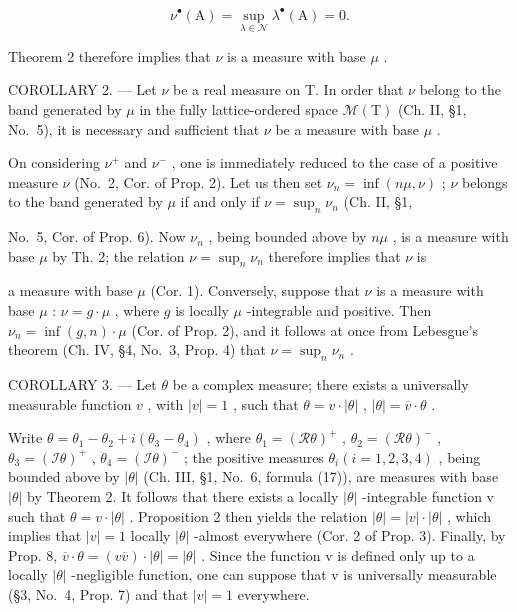 \[
\nu^ {\bullet} (\mathrm{A}) = \sup _ {\lambda \in \mathcal {N}} \lambda^ {\bullet} (\mathrm{A}) = 0.
\]

Theorem 2 therefore implies that \(\nu\) is a measure with base \(\mu\) .

COROLLARY 2. --- Let \(\nu\) be a real measure on T. In order that \(\nu\) belong to the band generated by \(\mu\) in the fully lattice-ordered space \(\mathcal{M}(\mathrm{T})\) (Ch. II, §1, No.~5), it is necessary and sufficient that \(\nu\) be a measure with base \(\mu\) .

On considering \(\nu^{+}\) and \(\nu^{-}\) , one is immediately reduced to the case of a positive measure \(\nu\) (No.~2, Cor. of Prop. 2). Let us then set \(\nu_{n} = \inf(n\mu, \nu)\) ; \(\nu\) belongs to the band generated by \(\mu\) if and only if \(\nu = \sup_{n} \nu_{n}\) (Ch. II, §1,

No.~5, Cor. of Prop. 6). Now \(\nu_{n}\) , being bounded above by \(n\mu\) , is a measure with base \(\mu\) by Th. 2; the relation \(\nu = \sup_{n} \nu_{n}\) therefore implies that \(\nu\) is

a measure with base \(\mu\) (Cor. 1). Conversely, suppose that \(\nu\) is a measure with base \(\mu\) : \(\nu = g \cdot \mu\) , where \(g\) is locally \(\mu\) -integrable and positive. Then \(\nu_n = \inf(g, n) \cdot \mu\) (Cor. of Prop. 2), and it follows at once from Lebesgue's theorem (Ch. IV, §4, No.~3, Prop. 4) that \(\nu = \sup_{n} \nu_n\) .

COROLLARY 3. --- Let \(\theta\) be a complex measure; there exists a universally measurable function \(v\) , with \(|v| = 1\) , such that \(\theta = v \cdot |\theta|\) , \(|\theta| = \overline{v} \cdot \theta\) .

Write \(\theta = \theta_{1} - \theta_{2} + i(\theta_{3} - \theta_{4})\) , where \(\theta_{1} = (\mathcal{R}\theta)^{+}\) , \(\theta_{2} = (\mathcal{R}\theta)^{-}\) , \(\theta_{3} = (\mathcal{I}\theta)^{+}\) , \(\theta_{4} = (\mathcal{I}\theta)^{-}\) ; the positive measures \(\theta_{i} (i = 1, 2, 3, 4)\) , being bounded above by \(|\theta|\) (Ch. III, §1, No.~6, formula (17)), are measures with base \(|\theta|\) by Theorem 2. It follows that there exists a locally \(|\theta|\) -integrable function v such that \(\theta = v \cdot |\theta|\) . Proposition 2 then yields the relation \(|\theta| = |v| \cdot |\theta|\) , which implies that \(|v| = 1\) locally \(|\theta|\) -almost everywhere (Cor. 2 of Prop. 3). Finally, by Prop. 8, \(\overline{v} \cdot \theta = (v\overline{v}) \cdot |\theta| = |\theta|\) . Since the function v is defined only up to a locally \(|\theta|\) -negligible function, one can suppose that v is universally measurable (§3, No.~4, Prop. 7) and that \(|v| = 1\) everywhere.

